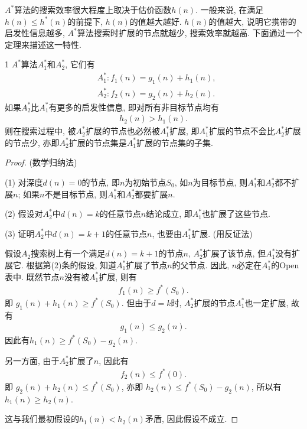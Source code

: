 $A^*$算法的搜索效率很大程度上取决于估价函数$h(n)$. 一般来说, 在满足$h(n) \leq h^*(n)$的前提下, $h(n)$的值越大越好. $h(n)$的值越大, 说明它携带的启发性信息越多, $A^*$算法搜索时扩展的节点就越少, 搜索效率就越高.
下面通过一个定理来描述这一特性.
\begin{mythm}{}{1}
$A^*$算法$A_1^*$和$A_2^*$, 它们有
\begin{align}
  &A_1^*:  f_1(n)=g_1(n)+h_1(n),\\
  &A_2^*:  f_2(n)=g_2(n)+h_2(n).
\end{align}
如果$A_2^*$比$A_1^*$有更多的启发性信息, 即对所有非目标节点均有
\begin{align}
  h_2(n)>h_1(n).
\end{align}
则在搜索过程中, 被$A_2^*$扩展的节点也必然被$A_1^*$扩展, 即$A_1^*$扩展的节点不会比$A_2^*$扩展的节点少, 亦即$A_2^*$扩展的节点集是$A_1^*$扩展的节点集的子集.
\end{mythm}
\begin{proof}
(数学归纳法)

(1) 对深度$d(n)=0$的节点, 即$n$为初始节点$S_0$, 如$n$为目标节点, 则$A_1^*$和$A_2^*$都不扩展$n$; 如果$n$不是目标节点, 则$A_1^*$和$A_2^*$都要扩展$n$.

(2) 假设对$A_2^*$中$d(n)=k$的任意节点$n$结论成立, 即$A_1^*$也扩展了这些节点.

(3) 证明$A_2^*$中$d(n)=k+1$的任意节点$n$, 也要由$A_1^*$扩展. (用反证法)

假设$A_2$搜索树上有一个满足$d(n)=k+1$的节点$n$, $A_2^*$扩展了该节点, 但$A_1^*$没有扩展它. 根据第(2)条的假设, 知道$A_1^*$扩展了节点$n$的父节点. 因此, $n$必定在$A_1^*$的Open表中. 既然节点$n$没有被$A_1^*$扩展, 则有
\begin{align}
  f_1(n)\geq f^*(S_0).
\end{align}
即 $g_1(n)+h_1(n)\geq f^*(S_0)$. 但由于$d=k$时, $A_2^*$扩展的节点$A_1^*$也一定扩展, 故有
\begin{align}
  g_1(n)\leq g_2(n).
\end{align}
因此有$h_1(n)\geq f^*(S_0)-g_2(n)$.

另一方面, 由于$A_2^ *$扩展了$n$, 因此有
\begin{align}
  f_2(n)\leq f^*(0).
\end{align}
即   $g_2(n)+h_2(n)\leq f^*(S_0)$, 亦即 $h_2(n)\leq f^*(S_0)-g_2(n)$, 所以有 $ h_1(n)\geq h_2(n)$.

这与我们最初假设的$h_1(n)<h_2(n)$矛盾, 因此假设不成立.
\end{proof}


